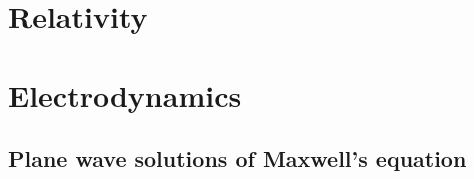 %
%
\part{Relativity}
   
   
   
   
   
   
   
   

\part{Electrodynamics}
   
   
   
   
   
   
   
   
   
   
   
  
   

   
   
   
   
   
   
   
   
   
   
   

   \chapter{Plane wave solutions of Maxwell's equation}
      
